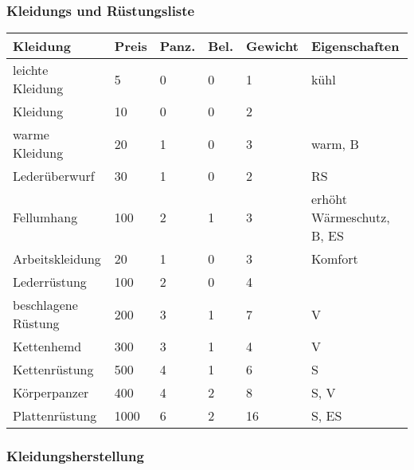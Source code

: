 \documentclass{article}
\begin{document}
\subsubsection{Kleidungs und Rüstungsliste}


\begin{small}
\begin{tabular}{|m{25mm}|m{1cm}|m{1cm}|m{1cm}|m{1cm}|m{6cm}|}
\hline
\textbf{Kleidung}&\textbf{Preis}&\textbf{Panz.}&\textbf{Bel.}&\textbf{Gewicht}&\textbf{Eigenschaften}\\
\hline
\hline
leichte Kleidung&5&0&0&1&kühl\\
\hline
Kleidung&10&0&0&2&\\
\hline
warme Kleidung&20&1&0&3&warm, B\\
\hline
Lederüberwurf&30&1&0&2&RS\\
\hline
Fellumhang&100&2&1&3&erhöht Wärmeschutz, B, ES\\
\hline
Arbeitskleidung&20&1&0&3&Komfort\\
\hline
Lederrüstung&100&2&0&4&\\
\hline
beschlagene Rüstung&200&3&1&7&V\\
\hline
Kettenhemd&300&3&1&4&V\\
\hline
Kettenrüstung&500&4&1&6&S\\
\hline
Körperpanzer&400&4&2&8&S, V\\
\hline
Plattenrüstung&1000&6&2&16&S, ES\\
\hline
\end{tabular}
\end{small}

\subsubsection{Kleidungsherstellung}
\end{document}
